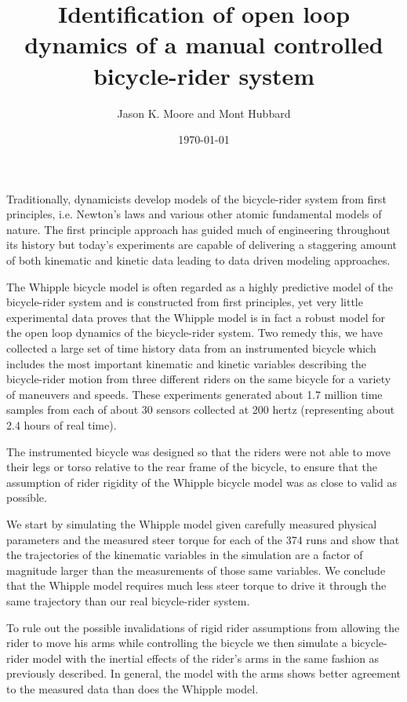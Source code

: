 \documentclass[a4paper]{article}
\title{Identification of open loop dynamics of a manual controlled
bicycle-rider system}
\author{Jason K. Moore and Mont Hubbard}
\date{\today}
\begin{document}
\maketitle

Traditionally, dynamicists develop models of the bicycle-rider system from
first principles, i.e. Newton's laws and various other atomic fundamental
models of nature. The first principle approach has guided much of engineering
throughout its history but today's experiments are capable of delivering a
staggering amount of both kinematic and kinetic data leading to data driven
modeling approaches.

The Whipple bicycle model is often regarded as a highly predictive model of the
bicycle-rider system and is constructed from first principles, yet very little
experimental data proves that the Whipple model is in fact a robust model for
the open loop dynamics of the bicycle-rider system. Two remedy this, we have
collected a large set of time history data from an instrumented bicycle which
includes the most important kinematic and kinetic variables describing the
bicycle-rider motion from three different riders on the same bicycle for a
variety of maneuvers and speeds. These experiments generated about 1.7 million
time samples from each of about 30 sensors collected at 200 hertz (representing
about 2.4 hours of real time).

The instrumented bicycle was designed so that the riders were not able to move
their legs or torso relative to the rear frame of the bicycle, to ensure that
the assumption of rider rigidity of the Whipple bicycle model was as close to
valid as possible.

We start by simulating the Whipple model given carefully measured physical
parameters and the measured steer torque for each of the 374 runs and show that
the trajectories of the kinematic variables in the simulation are a factor of
magnitude larger than the measurements of those same variables. We conclude
that the Whipple model requires much less steer torque to drive it through the
same trajectory than our real bicycle-rider system.

To rule out the possible invalidations of rigid rider assumptions from allowing
the rider to move his arms while controlling the bicycle we then simulate a
bicycle-rider model with the inertial effects of the rider's arms in the same
fashion as previously described. In general, the model with the arms shows
better agreement to the measured data than does the Whipple model.
\end{document}
